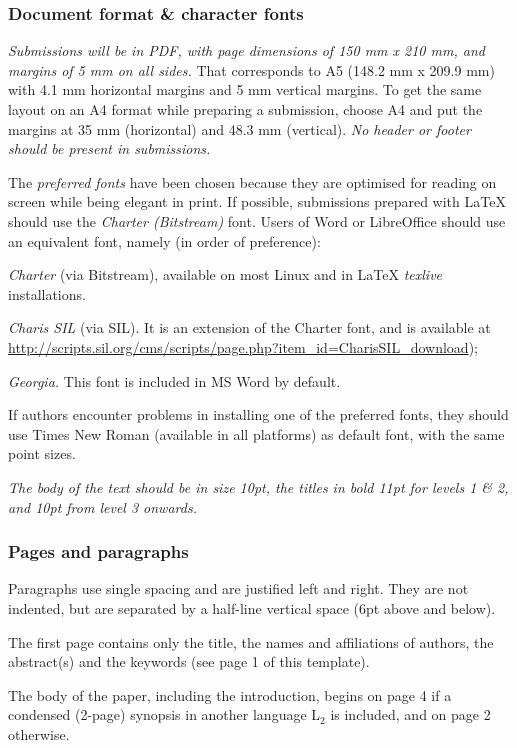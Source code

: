 \documentclass[10pt,a5paper,twoside]{article}
\begin{document}
\subsubsection{Document format \& character fonts}
\emph{Submissions will be in PDF, with page dimensions of 150 mm x 210 mm, and margins of 5 mm on all sides.} That corresponds to A5 (148.2 mm x 209.9 mm) with 4.1 mm horizontal margins and 5 mm vertical margins.  To get the same layout on an A4 format while preparing a submission, choose A4 and put the margins at 35 mm (horizontal) and 48.3 mm (vertical).
\newpage
\emph{No header or footer should be present in submissions.}

The \emph{preferred fonts} have been chosen because they are optimised for reading on screen while being elegant in print. If possible, submissions prepared with LaTeX should use the \emph{Charter (Bitstream)} font. Users of Word or LibreOffice should use an equivalent font, namely (in order of preference):
\begin{compactenum}
\item\emph{Charter} (via Bitstream), available on most Linux and in LaTeX \emph{texlive} installations.
\item\emph{Charis SIL} (via SIL). It is an extension of the Charter font, and is available at \href{http://scripts.sil.org/cms/scripts/page.php?item_id=CharisSIL_download}
{http://scripts.sil.org/cms/scripts/page.php?item\_id=CharisSIL\_download}); 
\item\emph{Georgia.} This font is included  in MS Word by default.
\end{compactenum} 
If authors encounter problems in installing one of the preferred fonts, they should use Times New Roman (available in all platforms) as default font, with the same point sizes.

\emph{The body of the text should be in size 10pt, the titles in bold 11pt for levels 1 \& 2, and 10pt from level 3 onwards.}
\subsubsection{Pages and paragraphs}
Paragraphs use single spacing and are justified left and right. They are not indented, but are separated by a half-line vertical space (6pt above and below).

The first page contains only the title, the names and affiliations of authors, the abstract(s) and the keywords (see page 1 of this template).

The body of the paper, including the introduction, begins on page 4 if a condensed (2-page) synopsis in another language L$_{2}$ is included, and on page 2 otherwise. 
\end{document}
